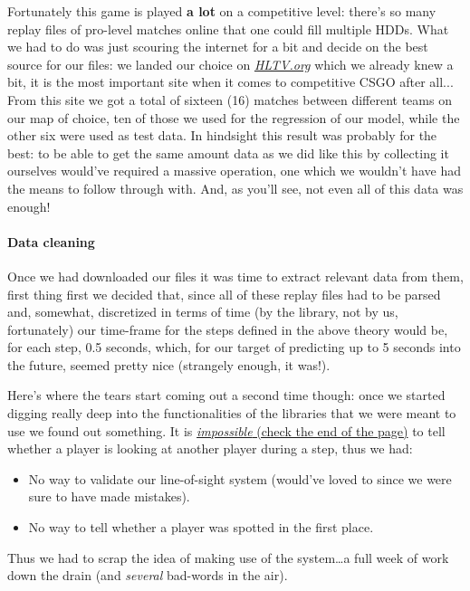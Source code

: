 \documentclass[9pt, a4paper]{IEEEtran}
\begin{document}
    Fortunately this game is played \textbf{a lot} on a competitive level: there's so many replay files of pro-level matches online that one could fill multiple HDDs. What we had to do was just scouring the internet for a bit and decide on the best source for our files: we landed our choice on \href{https://www.hltv.org/}{\emph{HLTV.org}} which we already knew a bit, it is the most important site when it comes to competitive CSGO after all... From this site we got a total of sixteen (16) matches between different teams on our map of choice, ten of those we used for the regression of our model, while the other six were used as test data.
    In hindsight this result was probably for the best: to be able to get the same amount data as we did like this by collecting it ourselves would've required a massive operation, one which we wouldn't have had the means to follow through with. And, as you'll see, not even all of this data was enough!

    \paragraph*{Data cleaning} Once we had downloaded our files it was time to extract relevant data from them, first thing first we decided that, since all of these replay files had to be parsed and, somewhat, discretized in terms of time (by the library, not by us, fortunately) our time-frame for the steps defined in the above theory would be, for each step, 0.5 seconds, which, for our target of predicting up to 5 seconds into the future, seemed pretty nice (strangely enough, it was!).
    
    Here's where the tears start coming out a second time though: once we started digging really deep into the functionalities of the libraries that we were meant to use we found out something. It is \href{https://pkg.go.dev/github.com/markus-wa/demoinfocs-golang/v2/pkg/demoinfocs}{\emph{impossible} (check the end of the page)} to tell whether a player is looking at another player during a step, thus we had:
    \begin{itemize}
        \item No way to validate our line-of-sight system (would've loved to since we were sure to have made mistakes).
        \item No way to tell whether a player was spotted in the first place.
    \end{itemize}
    Thus we had to scrap the idea of making use of the system\dots a full week of work down the drain (and \emph{several} bad-words in the air).
\end{document}
